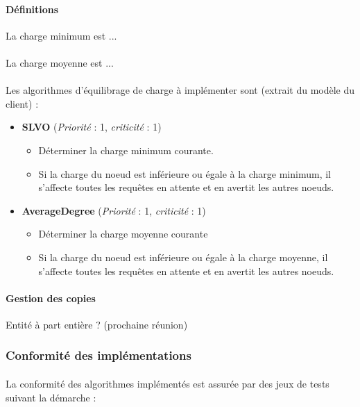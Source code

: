 \documentclass[12pt]{article}
\newcommand{\besoin}[2] {
  (\textit{Priorité} : #1, \textit{criticité} : #2)
}
\begin{document}
\paragraph{Définitions} La charge minimum est ...

\paragraph{} La charge moyenne est ...

\paragraph{} Les algorithmes d'équilibrage de charge à implémenter sont (extrait du modèle du client) :

\begin{itemize}
 \item \textbf{SLVO} \besoin{1}{1} 
 \begin{itemize}
  \item Déterminer la charge minimum courante.
  \item Si la charge du noeud est inférieure ou égale à la charge minimum, il s'affecte toutes les requêtes en attente et en avertit les autres noeuds. \vspace{0.2cm}
 \end{itemize}
 
 \item \textbf{AverageDegree} \besoin{1}{1} 
 \begin{itemize}
  \item Déterminer la charge moyenne courante
  \item Si la charge du noeud est inférieure ou égale à la charge moyenne, il s'affecte toutes les requêtes en attente et en avertit les autres noeuds.
 \end{itemize}

\end{itemize}

\paragraph{Gestion des copies} Entité à part entière ? (prochaine réunion)


\subsubsection{Conformité des implémentations}

\paragraph{} La conformité des algorithmes implémentés est assurée par des jeux de tests suivant la démarche :
\end{document}
